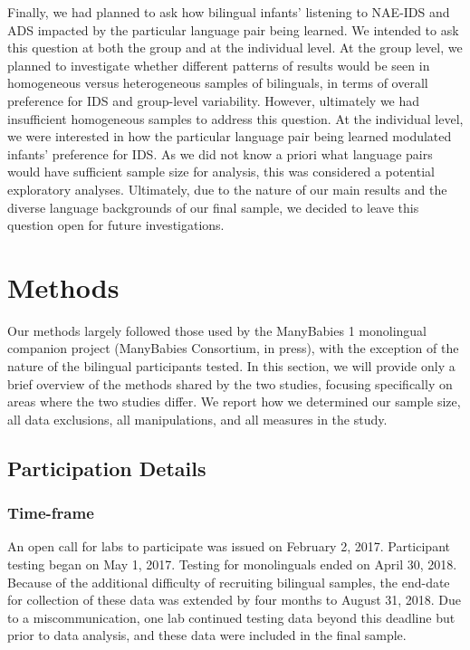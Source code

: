 \documentclass[,man,floatsintext]{apa6}
\begin{document}
\begin{enumerate}
  Finally, we had planned to ask how bilingual infants' listening to NAE-IDS and ADS impacted by the particular language pair being learned. We intended to ask this question at both the group and at the individual level. At the group level, we planned to investigate whether different patterns of results would be seen in homogeneous versus heterogeneous samples of bilinguals, in terms of overall preference for IDS and group-level variability. However, ultimately we had insufficient homogeneous samples to address this question. At the individual level, we were interested in how the particular language pair being learned modulated infants' preference for IDS. As we did not know a priori what language pairs would have sufficient sample size for analysis, this was considered a potential exploratory analyses. Ultimately, due to the nature of our main results and the diverse language backgrounds of our final sample, we decided to leave this question open for future investigations.
\end{enumerate}

\hypertarget{methods}{%
\section{Methods}\label{methods}}

Our methods largely followed those used by the ManyBabies 1 monolingual companion project (ManyBabies Consortium, in press), with the exception of the nature of the bilingual participants tested. In this section, we will provide only a brief overview of the methods shared by the two studies, focusing specifically on areas where the two studies differ. We report how we determined our sample size, all data exclusions, all manipulations, and all measures in the study.

\hypertarget{participation-details}{%
\subsection{Participation Details}\label{participation-details}}

\hypertarget{time-frame}{%
\subsubsection{Time-frame}\label{time-frame}}

An open call for labs to participate was issued on February 2, 2017. Participant testing began on May 1, 2017. Testing for monolinguals ended on April 30, 2018. Because of the additional difficulty of recruiting bilingual samples, the end-date for collection of these data was extended by four months to August 31, 2018. Due to a miscommunication, one lab continued testing data beyond this deadline but prior to data analysis, and these data were included in the final sample.
\end{document}
